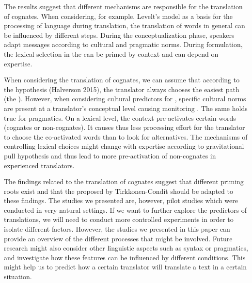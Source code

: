 \documentclass[output=paper]{LSP/langsci}
\begin{document}
\newpage
The results suggest that different mechanisms are responsible for the translation of cognates. When considering, for example, Levelt’s  model \citeyearpar{Levelt1989} as a basis for the processing of language during translation, the translation of words in general can be influenced by different steps. During the conceptualization phase, speakers adapt messages according to cultural and pragmatic norms. During formulation, the lexical selection in the  can be primed by context and can depend on expertise.

When considering the translation of cognates, we can assume that according to the  hypothesis (Halverson 2015), the translator always chooses the easiest path (the ). However, when considering cultural predictors for , specific cultural norms are present at a translator’s conceptual level causing monitoring \citep{TirkkonenCondit2005}. The same holds true for pragmatics. On a lexical level, the context pre-activates certain words (cognates or non-cognates). It causes thus less processing effort for the translator to choose the co-activated words than to look for alternatives. The mechanisms of controlling lexical choices might change with expertise according to \citet{Halverson2015} gravitational pull hypothesis and thus lead to more pre-activation of non-cognates in experienced translators.

The findings related to the translation of cognates suggest that different priming roots exist and that the  proposed by Tirkkonen-Condit should be adapted to these findings. The studies we presented are, however, pilot studies which were conducted in very natural settings. If we want to further explore the predictors of translations, we will need to conduct more controlled experiments in order to isolate different factors. However, the studies we presented in this paper can provide an overview of the different processes that might be involved. Future research might also consider other linguistic aspects such as syntax or pragmatics, and investigate how these features can be influenced by different conditions. This might help us to predict how a certain translator will translate a text in a certain situation.

\sloppy
\printbibliography[heading=subbibliography,notkeyword=this]
\end{document}
